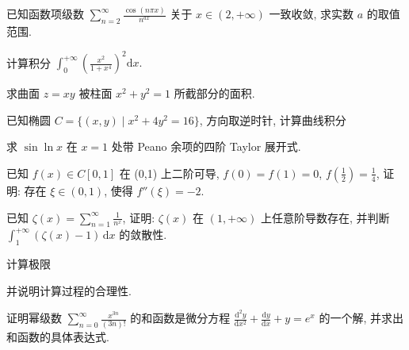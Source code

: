 已知函数项级数 $\sum_{n=2}^{\infty} \frac{\cos(n\pi x)}{n^{ax}}$ 关于 $x \in (2, +\infty)$ 一致收敛, 求实数 $a$ 的取值范围.\par
计算积分 $\int_0^{+\infty}\left(\frac{x^2}{1 + x^4}\right)^2\mathrm{d}x.$\par
求曲面 $z = xy$ 被柱面 $x^{2} + y^{2} = 1$ 所截部分的面积.\par
\par{}
已知椭圆 $C = \{(x, y) \mid x^2 + 4y^2 = 16\}$, 方向取逆时针, 计算曲线积分\par
\nopagebreak[4]
求 $\sin \ln x$ 在 $x = 1$ 处带 Peano 余项的四阶 Taylor 展开式.\par
已知 $f(x) \in C[0,1]$ 在 (0,1) 上二阶可导, $f(0) = f(1) = 0$, $f\left(\frac{1}{2}\right) = \frac{1}{4}$, 证明: 存在 $\xi \in (0,1)$, 使得 $f''(\xi) = -2$.\par
已知 $\zeta(x) = \sum_{n=1}^{\infty} \frac{1}{n^x}$, 证明: $\zeta(x)$ 在 $(1, +\infty)$ 上任意阶导数存在, 并判断 $\int_{1}^{+\infty} (\zeta(x) - 1) \, \mathrm{d}x$ 的敛散性.\par
\par{}
计算极限\par
\nopagebreak[4]
并说明计算过程的合理性.\par
证明幂级数 $\sum_{n=0}^{\infty} \frac{x^{3n}}{(3n)!}$ 的和函数是微分方程 $\frac{\mathrm{d}^2 y}{\mathrm{d}x^2} + \frac{\mathrm{d}y}{\mathrm{d}x} + y = e^x$ 的一个解, 并求出和函数的具体表达式.\par
